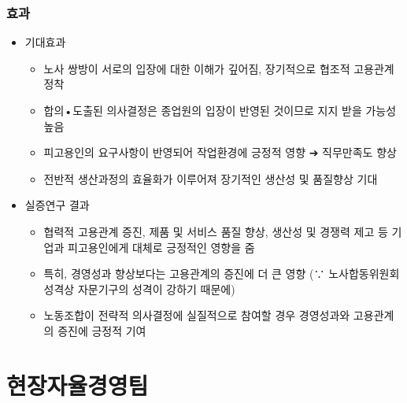 \documentclass[aspectratio=169,xcolor=dvipsnames,handout]{beamer}
\begin{document}
\begin{frame}
    \frametitle{효과}
    \begin{itemize}[<+->]
        \item 기대효과
        \begin{itemize}[<+->]
            \item 노사 쌍방이 서로의 입장에 대한 이해가 깊어짐, 장기적으로 협조적 고용관계 정착
            \item 합의•도출된 의사결정은 종업원의 입장이 반영된 것이므로 지지 받을 가능성 높음
            \item 피고용인의 요구사항이 반영되어 작업환경에 긍정적 영향 ➔ 직무만족도 향상
            \item 전반적 생산과정의 효율화가 이루어져 장기적인 생산성 및 품질향상 기대
        \end{itemize}
        \item 실증연구 결과
        \begin{itemize}[<+->]
            \item 협력적 고용관계 증진, 제품 및 서비스 품질 향상, 생산성 및 경쟁력 제고 등 기업과 피고용인에게 대체로 긍정적인 영향을 줌
            \item 특히, 경영성과 향상보다는 고용관계의 증진에 더 큰 영향 (∵ 노사합동위원회 성격상 자문기구의 성격이 강하기 때문에)
            \item 노동조합이 전략적 의사결정에 실질적으로 참여할 경우 경영성과와 고용관계의 증진에 긍정적 기여
        \end{itemize}
    \end{itemize}
\end{frame}

\section{현장자율경영팀}%
\end{document}
